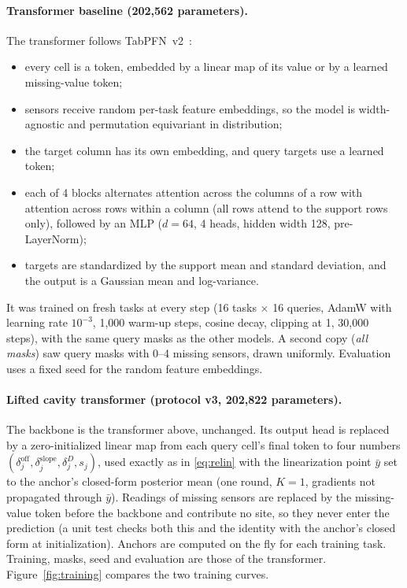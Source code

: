 \paragraph{Transformer baseline (202{,}562 parameters).}
The transformer follows TabPFN~v2~\citep{hollmann2025tabpfnv2}:
\begin{itemize}
  \item every cell is a token, embedded by a linear map of its value or by a learned missing-value token;
  \item sensors receive random per-task feature embeddings, so the model is width-agnostic and permutation
  equivariant in distribution;
  \item the target column has its own embedding, and query targets use a learned token;
  \item each of 4 blocks alternates attention across the columns of a row with attention across rows within a
  column (all rows attend to the support rows only), followed by an MLP ($d=64$, 4 heads, hidden width 128,
  pre-LayerNorm);
  \item targets are standardized by the support mean and standard deviation, and the output is a Gaussian mean and
  log-variance.
\end{itemize}
It was trained on fresh tasks at every step (16 tasks $\times$ 16 queries, AdamW with learning rate $10^{-3}$, 1{,}000
warm-up steps, cosine decay, clipping at 1, 30{,}000 steps), with the same query masks as the other models. A second
copy (\emph{all masks}) saw query masks with 0--4 missing sensors, drawn uniformly. Evaluation uses a fixed seed for
the random feature embeddings.

\paragraph{Lifted cavity transformer (protocol v3, 202{,}822 parameters).}
The backbone is the transformer above, unchanged. Its output head is replaced by a zero-initialized linear map from
each query cell's final token to four numbers $(\delta^{\mathrm{off}}_j,\delta^{\mathrm{slope}}_j,\delta^{D}_j,s_j)$,
used exactly as in \eqref{eq:relin} with the linearization point $\bar y$ set to the anchor's closed-form posterior
mean (one round, $K=1$, gradients not propagated through $\bar y$). Readings of missing sensors are replaced by the
missing-value token before the backbone and contribute no site, so they never enter the prediction (a unit test
checks both this and the identity with the anchor's closed form at initialization). Anchors are computed on the fly
for each training task. Training, masks, seed and evaluation are those of the transformer. Figure~\ref{fig:training} compares
the two training curves.

